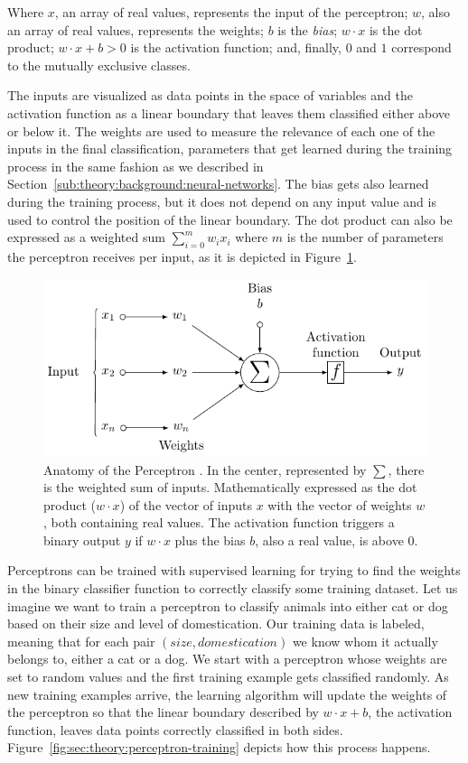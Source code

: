 Where $x$, an array of real values, represents the input of the perceptron; $w$, also an array of real values, represents the weights; $b$ is the \emph{bias}; ${w}\cdot{x}$ is the dot product; ${w}\cdot{x}+b > 0$ is the activation function; and, finally, $0$ and $1$ correspond to the mutually exclusive classes.

The inputs are visualized as data points in the space of variables and the activation function as a linear boundary that leaves them classified either above or below it.
The weights are used to measure the relevance of each one of the inputs in the final classification, parameters that get learned during the training process in the same fashion as we described in Section~\ref{sub:theory:background:neural-networks}.
The bias gets also learned during the training process, but it does not depend on any input value and is used to control the position of the linear boundary.
The dot product can also be expressed as a weighted sum $\sum_{i=0}^{m} w_i x_i$ where $m$ is the number of parameters the perceptron receives per input, as it is depicted in Figure~\ref{fig:sec:theory:perceptron}.

\begin{figure}[t]
  \includegraphics[width=\textwidth]{tkz/perceptron}
  \caption{
    Anatomy of the Perceptron \cite{Medina2013}.
    In the center, represented by $\sum$, there is the weighted sum of inputs.
    Mathematically expressed as the dot product (${w}\cdot{x}$) of the vector of inputs $x$ with the vector of weights $w$, both containing real values.
    The activation function triggers a binary output $y$ if ${w}\cdot{x}$ plus the bias $b$, also a real value, is above $0$.
  }
  \label{fig:sec:theory:perceptron}
\end{figure}

Perceptrons can be trained with supervised learning for trying to find the weights in the binary classifier function to correctly classify some training dataset.
Let us imagine we want to train a perceptron to classify animals into either cat or dog based on their size and level of domestication.
Our training data is labeled, meaning that for each pair $(size, domestication)$ we know whom it actually belongs to, either a cat or a dog.
We start with a perceptron whose weights are set to random values and the first training example gets classified randomly.
As new training examples arrive, the learning algorithm will update the weights of the perceptron so that the linear boundary described by ${w}\cdot{x}+b$, the activation function, leaves data points correctly classified in both sides.
Figure~\ref{fig:sec:theory:perceptron-training} depicts how this process happens.

